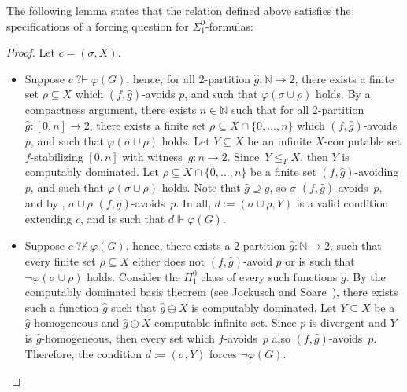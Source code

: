 \documentclass{article}
\newcommand{\qvdash}{\operatorname{{?}{\vdash}}}
\newcommand{\nqvdash}{\operatorname{{?}{\nvdash}}}
\newcommand{\NN}[0]{\mathbb{N}}
\def\N{\mathbb{N}}
\def\NN{\mathbb{N}}
\numberwithin{theorem}{section}
\newtheorem{lemma}[theorem]{Lemma}
\theoremstyle{definition}
\begin{document}
The following lemma states that the relation defined above satisfies the specifications of a forcing question for $\Sigma^0_1$-formulas:


\begin{proof}
Let $c = (\sigma, X)$.
    \begin{itemize}
        \item Suppose  $c \qvdash \varphi(G)$, hence, for all 2-partition $\hat g : \N \to 2$, there exists a finite set $\rho \subseteq X$ which $(f,\hat g)$-avoids $p$, and such that $\varphi(\sigma \cup \rho)$ holds. By a compactness argument, there exists $n \in \NN$ such that for all 2-partition $\hat g : [0, n] \to 2$, there exists a finite set $\rho \subseteq X \cap \{0, \dots, n \}$ which $(f,\hat g)$-avoids $p$, and such that $\varphi(\sigma \cup \rho)$ holds. Let $Y \subseteq X$ be an infinite $X$-computable set $f$-stabilizing $[0, n]$ with witness~$\hat g : n \to 2$. Since~$Y \leq_T X$, then $Y$ is computably dominated. Let $\rho \subseteq X \cap \{0, \dots, n \}$ be a finite set $(f,\hat g)$-avoiding $p$, and such that $\varphi(\sigma \cup \rho)$ holds. Note that $\hat g \supseteq g$, so $\sigma$ $(f, \hat g)$-avoids~$p$, and by , $\sigma \cup \rho$ $(f, \hat g)$-avoids~$p$.
        In all, $d := (\sigma \cup \rho, Y)$ is a valid condition extending $c$, and is such that $d \Vdash \varphi(G)$.
        
        \item Suppose $c \nqvdash \varphi(G)$, hence, there exists a 2-partition $\hat g : \N \to 2$, such that every finite set $\rho \subseteq X$ either does not $(f,\hat g)$-avoid $p$ or is such that $\neg \varphi(\sigma \cup \rho)$ holds. Consider the $\Pi_1^0$ class of every such functions $\hat g$. By the computably dominated basis theorem (see Jockusch and Soare~\cite{jockusch197classes}), there exists such a function $\hat g$ such that $\hat g \oplus X$ is computably dominated.
        Let $Y \subseteq X$ be a $\hat g$-homogeneous and $\hat g \oplus X$-computable infinite set. Since $p$ is divergent and $Y$ is $\hat g$-homogeneous, then every set which $f$-avoids~$p$ also $(f, \hat g)$-avoids~$p$. Therefore, the condition $d := (\sigma,Y)$ forces $\neg \varphi(G)$.
    \end{itemize}
    
\end{proof}
\end{document}
